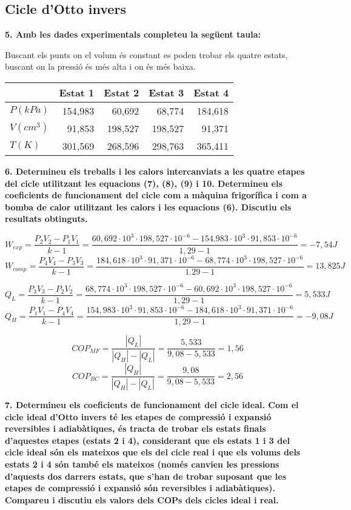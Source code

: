 \documentclass[a4paper]{article}
\begin{document}
\subsection*{Cicle d'Otto invers}

\textbf{5. Amb les dades experimentals completeu la següent taula:}

Buscant els punts on el volum és constant es poden trobar els quatre estats, buscant on la pressió és més alta i on és més baixa.

\begin{center}
	\begin{tabular}{l|rrrr}
		& Estat 1 & Estat 2 & Estat 3 & Estat 4 \\
		\hline
		$P(kPa)$ & 154,983 & 60,692 & 68,774 & 184,618 \\
		$V(cm^3)$ & 91,853 & 198,527 & 198,527 & 91,371 \\
		$T(K)$ & 301,569 & 268,596 & 298,763 & 365,411 \\
	\end{tabular}
\end{center}

\textbf{6. Determineu els treballs i les calors intercanviats a les quatre etapes del cicle utilitzant les equacions (7), (8), (9) i 10. Determineu els coeficients de funcionament del cicle com a màquina frigorífica i com a bomba de calor utilitzant les calors i les equacions (6). Discutiu els resultats obtinguts.}

$$ W_{exp} = \frac{P_2 V_2 - P_1 V_1}{k - 1} = 
\frac{60,692·10^3 · 198,527·10^{-6} - 154.983·10^3 · 91,853·10^{-6}}{1,29 - 1} =
\boxed{-7,54J} 
$$
$$ W_{comp} = \frac{P_4 V_4 - P_3 V_3}{k - 1} = 
\frac{184,618·10^3 · 91,371·10^{-6} - 68,774·10^3 · 198,527·10^{-6}}{1.29 - 1} =
\boxed{13,825J}
$$

$$ Q_L = \frac{P_3 V_3 - P_2 V_2}{k - 1} = 
\frac{68,774·10^3 · 198,527·10^{-6} - 60,692·10^3 · 198,527·10^{-6}}{1,29 - 1} = 
\boxed{5,533J}
$$
$$ Q_H = \frac{P_1 V_1 - P_4 V_4}{k - 1} =
\frac{154,983·10^3 · 91,853·10^{-6} - 184,618·10^3 · 91,371·10^{-6}}{1,29 - 1} =
\boxed{-9,08J}
$$

$$ 
COP_{MF} = \frac{|Q_L|}{|Q_H| - |Q_L|} =
\frac{5,533}{9,08 - 5,533} = \boxed{1,56} 
$$
$$ 
COP_{BC} = \frac{|Q_H|}{|Q_H| - |Q_L|} =
\frac{9,08}{9,08 - 5,533} = \boxed{2,56} 
$$

\textbf{7. Determineu els coeficients de funcionament del cicle ideal. Com el cicle ideal d’Otto invers té les etapes de compressió i expansió reversibles i adiabàtiques, és tracta de trobar els estats finals d’aquestes etapes (estats 2 i 4), considerant que els estats 1 i 3 del cicle ideal són els mateixos que els del cicle real i que els volums dels estats 2 i 4 són també els mateixos (només canvien les pressions d’aquests dos darrers estats, que s’han de trobar suposant que les etapes de compressió i expansió són reversibles i adiabàtiques). Compareu i discutiu els valors dels COPs dels cicles ideal i real.}
\end{document}
